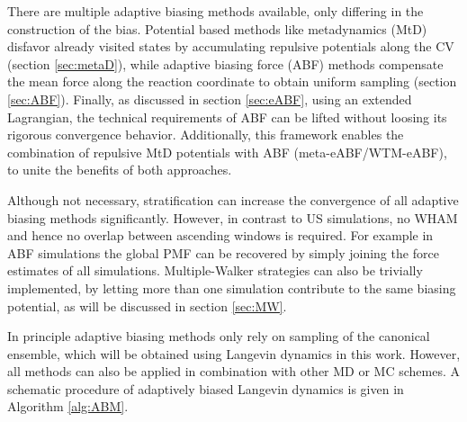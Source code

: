 There are multiple adaptive biasing methods available, only differing in the construction of the bias. Potential based methods like metadynamics (MtD) disfavor already visited states by accumulating repulsive potentials along the CV (section \ref{sec:metaD}), while adaptive biasing force (ABF) methods compensate the mean force along the reaction coordinate to obtain uniform sampling (section \ref{sec:ABF}). Finally, as discussed in section \ref{sec:eABF}, using an extended Lagrangian, the technical requirements of ABF can be lifted without loosing its rigorous convergence behavior.\autocite{lesage2017smoothed} Additionally, this framework enables the combination of repulsive MtD potentials with ABF (meta-eABF/WTM-eABF), to unite the benefits of both approaches.\autocite{fu2018zooming,fu2019taming}

Although not necessary, stratification can increase the convergence of all adaptive biasing methods significantly. However, in contrast to US simulations, no WHAM and hence no overlap between ascending windows is required. For example in ABF simulations the global PMF can be recovered by simply joining the force estimates of all simulations.\autocite{comer2015adaptive} Multiple-Walker strategies can also be trivially implemented, by letting more than one simulation contribute to the same biasing potential, as will be discussed in section \ref{sec:MW}.\autocite{minoukadeh2010potential}

In principle adaptive biasing methods only rely on sampling of the canonical ensemble, which will be obtained using Langevin dynamics in this work. However, all methods can also be applied in combination with other MD or MC schemes. A schematic procedure of adaptively biased Langevin dynamics is given in Algorithm \ref{alg:ABM}.

